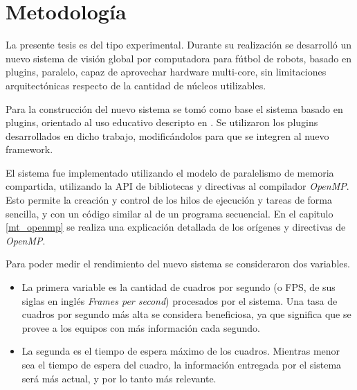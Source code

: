 
\section{Metodología}

\label{metodologia}

La presente tesis es del tipo experimental. Durante su realización se desarrolló
un nuevo sistema de visión global por computadora para fútbol de robots, basado
en plugins, paralelo, capaz de aprovechar hardware multi-core, sin limitaciones
arquitectónicas respecto de la cantidad de núcleos utilizables.

Para la construcción del nuevo sistema se tomó como base el sistema basado en
plugins, orientado al uso educativo descripto en \cite{torres2014}. Se
utilizaron los plugins desarrollados en dicho trabajo, modificándolos para que
se integren al nuevo framework.

El sistema fue implementado utilizando el modelo de paralelismo de memoria
compartida, utilizando la API de bibliotecas y directivas al compilador
\emph{OpenMP}. Esto permite la creación y control de los hilos de ejecución y
tareas de forma sencilla, y con un código similar al de un programa secuencial.
En el capitulo \ref{mt_openmp} se realiza una explicación detallada de los
orígenes y directivas de \emph{OpenMP}.

Para poder medir el rendimiento del nuevo sistema se consideraron dos variables.

\begin {itemize}

	\item	La primera variable es la cantidad de cuadros por segundo (o
		FPS, de sus siglas en inglés \emph{Frames per second})
		procesados por el sistema. Una tasa de cuadros por segundo más
		alta se considera beneficiosa, ya que significa que se provee a
		los equipos con más información cada segundo.

	\item	La segunda es el tiempo de espera máximo de los cuadros.
		Mientras menor sea el tiempo de espera del cuadro, la
		información entregada por el sistema será más actual, y por lo
		tanto más relevante.

\end {itemize}
